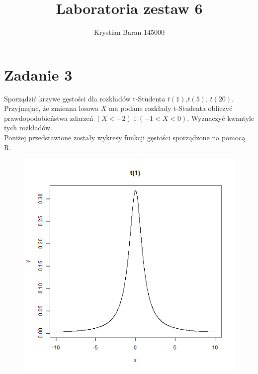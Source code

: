 \documentclass{article}
\author{Krystian Baran 145000}
\title{Laboratoria zestaw 6}
\begin{document}
\maketitle
\newpage

\section*{Zadanie 3}
Sporządzić krzywe gęstości dla rozkładów t-Studenta $t(1)$,$t(5)$, $t(20)$.
Przyjmując, że zmienna losowa $X$ ma podane rozkłady t-Studenta obliczyć
prawdopodobieństwa zdarzeń $(X < -2)$ i $(-1 < X < 0)$. Wyznaczyć kwantyle tych
rozkładów.\\

Poniżej przedstawione zostały wykresy funkcji gęstości sporządzone na pomocą R.
\begin{figure}[h!]
\begin{center}
\includegraphics[height=0.5\textheight, angle=0]{"Student1.png"}
\end{center}
\end{figure}

\newpage
\end{document}
